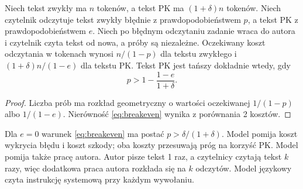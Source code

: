 \begin{theorem}
\label{thm:breakeven}
Niech tekst zwykły ma $n$ tokenów, a tekst PK ma $(1+\delta)n$ tokenów. Niech czytelnik
odczytuje tekst zwykły błędnie z prawdopodobieństwem $p$, a tekst PK z prawdopodobieństwem
$e$. Niech po błędnym odczytaniu zadanie wraca do autora i czytelnik czyta tekst od nowa,
a próby są niezależne. Oczekiwany koszt odczytania w tokenach wynosi $n/(1-p)$ dla tekstu
zwykłego i $(1+\delta)n/(1-e)$ dla tekstu PK. Tekst PK jest tańszy dokładnie wtedy, gdy
\begin{equation}
\label{eq:breakeven}
p>1-\frac{1-e}{1+\delta}.
\end{equation}
\end{theorem}

\begin{proof}
Liczba prób ma rozkład geometryczny o wartości oczekiwanej $1/(1-p)$ albo $1/(1-e)$.
Nierówność \eqref{eq:breakeven} wynika z porównania 2 kosztów.
\end{proof}

Dla $e=0$ warunek \eqref{eq:breakeven} ma postać $p>\delta/(1+\delta)$. Model pomija koszt
wykrycia błędu i koszt szkody; oba koszty przesuwają próg na korzyść PK. Model pomija
także pracę autora. Autor pisze tekst 1 raz, a czytelnicy czytają tekst $k$ razy, więc
dodatkowa praca autora rozkłada się na $k$ odczytów. Model językowy czyta instrukcję
systemową przy każdym wywołaniu.
